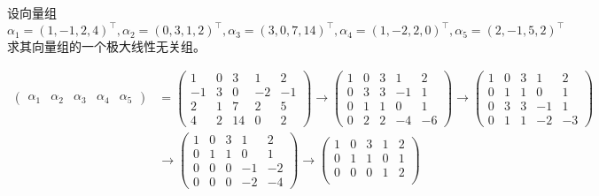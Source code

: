 \begin{example}
    设向量组$\alpha_1 = (1,-1,2,4)^\intercal, \alpha_2 = (0,3,1,2)^\intercal, \alpha_3 = (3,0,7,14)^\intercal, \alpha_4 = (1,-2,2,0)^\intercal,\alpha_5 = (2,-1,5,2)^\intercal$
    求其向量组的一个极大线性无关组。
\end{example}
\begin{solution}
    \begin{align*}
        \begin{pmatrix}
            \alpha_1 & \alpha_2 & \alpha_3 & \alpha_4 & \alpha_5
        \end{pmatrix}
         & =
        \begin{pmatrix}
            1  & 0 & 3  & 1  & 2  \\
            -1 & 3 & 0  & -2 & -1 \\
            2  & 1 & 7  & 2  & 5  \\
            4  & 2 & 14 & 0  & 2
        \end{pmatrix}
        \longrightarrow
        \begin{pmatrix}
            1 & 0 & 3 & 1  & 2  \\
            0 & 3 & 3 & -1 & 1  \\
            0 & 1 & 1 & 0  & 1  \\
            0 & 2 & 2 & -4 & -6
        \end{pmatrix}
        \longrightarrow
        \begin{pmatrix}
            1 & 0 & 3 & 1  & 2  \\
            0 & 1 & 1 & 0  & 1  \\
            0 & 3 & 3 & -1 & 1  \\
            0 & 1 & 1 & -2 & -3
        \end{pmatrix} \\
         & \longrightarrow
        \begin{pmatrix}
            1 & 0 & 3 & 1  & 2  \\
            0 & 1 & 1 & 0  & 1  \\
            0 & 0 & 0 & -1 & -2 \\
            0 & 0 & 0 & -2 & -4
        \end{pmatrix}
        \longrightarrow
        \begin{pmatrix}
            1 & 0 & 3 & 1 & 2 \\
            0 & 1 & 1 & 0 & 1 \\
            0 & 0 & 0 & 1 & 2 \\

\end{pmatrix}
\end{align*}
\end{solution}
